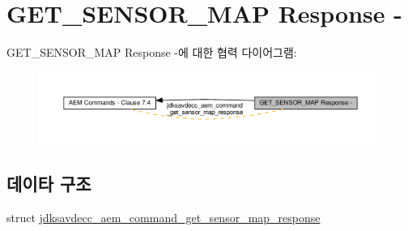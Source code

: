 \hypertarget{group__command__get__sensor__map__response}{}\section{G\+E\+T\+\_\+\+S\+E\+N\+S\+O\+R\+\_\+\+M\+AP Response -\/}
\label{group__command__get__sensor__map__response}
G\+E\+T\+\_\+\+S\+E\+N\+S\+O\+R\+\_\+\+M\+AP Response -\/에 대한 협력 다이어그램\+:
\nopagebreak
\begin{figure}[H]
\begin{center}
\leavevmode
\includegraphics[width=350pt]{group__command__get__sensor__map__response}
\end{center}
\end{figure}
\subsection*{데이타 구조}
\begin{DoxyCompactItemize}
\item 
struct \hyperlink{structjdksavdecc__aem__command__get__sensor__map__response}{jdksavdecc\+\_\+aem\+\_\+command\+\_\+get\+\_\+sensor\+\_\+map\+\_\+response}
\end{DoxyCompactItemize}
